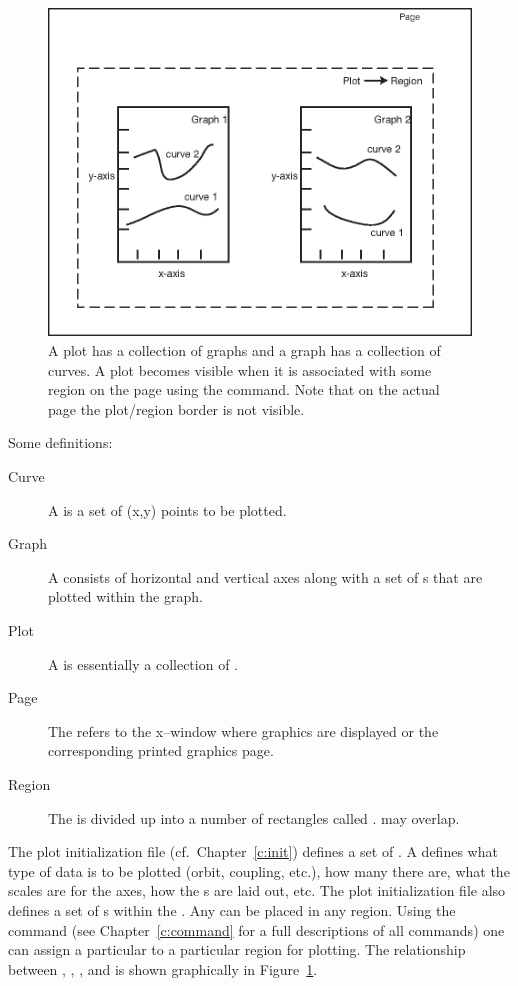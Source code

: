 \begin{figure}
  \centering
  \includegraphics{plot.eps}
  \caption[A plot has a collection of graphs.]
{A plot has a collection of graphs and a graph has a 
collection of curves. A plot becomes visible when it is associated
with some region on the page using the  command. Note that
on the actual page the plot/region border is not visible.}
  \label{f:plot}
\end{figure}

Some definitions:
  \vspace*{-3ex}
\begin{description}
\item[Curve] \Newline
A  is a set of (x,y) points to be plotted.
\item[Graph] \Newline
A  consists of horizontal and vertical axes along with a set
of s that are plotted within the graph. 
\item[Plot] \Newline
A  is essentially a collection of .
\item[Page] \Newline
The  refers to the x--window where graphics are displayed or the 
corresponding printed graphics page.
\item[Region] \Newline
The  is divided up into a number of rectangles called
.  may overlap.
\end{description}

The plot initialization file (cf.~Chapter~\ref{c:init}) defines a set
of . A  defines what type of data is
to be plotted (orbit, coupling, etc.), how many  there are,
what the scales are for the  axes, how the s are
laid out, etc.  The plot initialization file also defines a set of
s within the . Any  can be
placed in any region. Using the  command (see
Chapter~\ref{c:command} for a full descriptions of all commands) one
can assign a particular  to a particular region for
plotting.  The relationship between , ,
, and  is shown graphically in
Figure~\ref{f:plot}.

